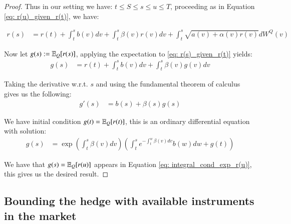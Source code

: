 \begin{proof}
  
Thus in our setting we have: $t\leq S \leq s \leq u \leq T$, proceeding as in Equation \ref{eq: r(u)_given_r(t)}, we have:

\begin{align}
\label{eq: r(s)_given_r(t)}
r(s) &= r(t) + \int_{t}^{s}b(v)dv + \int_{t}^{s}\beta(v)r(v)dv 
+ 
\int_{t}^{s}
\sqrt{a(v) + \alpha(v)r(v)}dW^{Q}(v)
\end{align}


Now let $g(s) := \mathbb{E}_{Q}[r(s)]$, applying the expectation to \ref{eq: r(s)_given_r(t)} yields:
\begin{align*}
g(s) &= r(t) + \int_{t}^{s}b(v)dv + \int_{t}^{s}\beta(v)g(v)dv    
\end{align*}

Taking the derivative w.r.t. $s$ and using the fundamental theorem of calculus gives us the following: 
\begin{align*}
g'(s) &= b(s) + \beta(s)g(s)    
\end{align*}

We have initial condition $g(t) = \mathbb{E}_{Q}[r(t)]$, this is an ordinary differential equation with solution:
\begin{align*}
g(s) &= \exp\left(
\int_{t}^{s}\beta(v)dv
\right)
\left(
\int_{t}^{s}e^{-\int_{t}^{w}\beta(v)dv}b(w)dw +g(t)
\right)    
\end{align*}

We have that $g(s) = \mathbb{E}_{Q}[r(u)]$ appears in Equation \ref{eq: integral_cond_exp_r(u)}, this gives us the desired result. 

\end{proof}


\subsection{Bounding the hedge with available instruments in the market}

